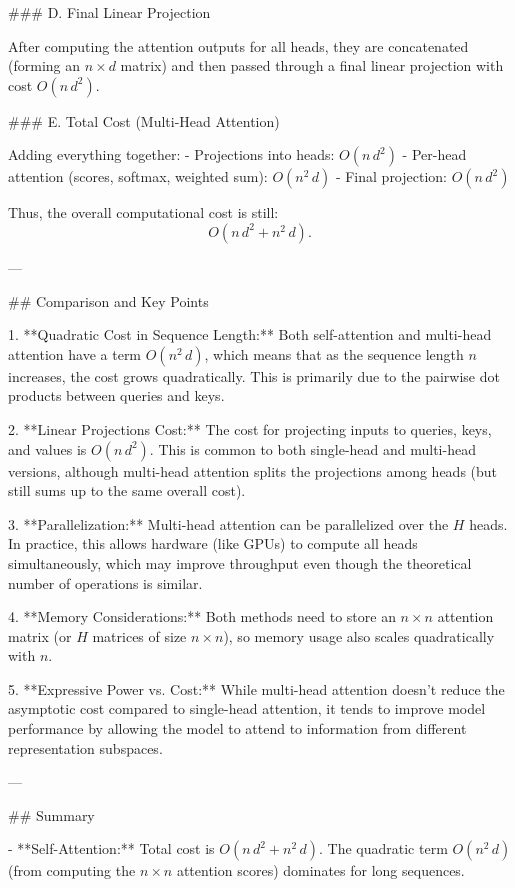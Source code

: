 ### D. Final Linear Projection

After computing the attention outputs for all heads, they are concatenated (forming an \( n \times d \) matrix) and then passed through a final linear projection with cost \( O(n\, d^2) \).

### E. Total Cost (Multi-Head Attention)

Adding everything together:
- Projections into heads: \( O(n\, d^2) \)
- Per-head attention (scores, softmax, weighted sum): \( O(n^2\, d) \)
- Final projection: \( O(n\, d^2) \)

Thus, the overall computational cost is still:
\[
O(n\, d^2 + n^2\, d).
\]

---

## Comparison and Key Points

1. **Quadratic Cost in Sequence Length:**  
   Both self-attention and multi-head attention have a term \( O(n^2\, d) \), which means that as the sequence length \( n \) increases, the cost grows quadratically. This is primarily due to the pairwise dot products between queries and keys.

2. **Linear Projections Cost:**  
   The cost for projecting inputs to queries, keys, and values is \( O(n\, d^2) \). This is common to both single-head and multi-head versions, although multi-head attention splits the projections among heads (but still sums up to the same overall cost).

3. **Parallelization:**  
   Multi-head attention can be parallelized over the \( H \) heads. In practice, this allows hardware (like GPUs) to compute all heads simultaneously, which may improve throughput even though the theoretical number of operations is similar.

4. **Memory Considerations:**  
   Both methods need to store an \( n \times n \) attention matrix (or \( H \) matrices of size \( n \times n \)), so memory usage also scales quadratically with \( n \).

5. **Expressive Power vs. Cost:**  
   While multi-head attention doesn’t reduce the asymptotic cost compared to single-head attention, it tends to improve model performance by allowing the model to attend to information from different representation subspaces.

---

## Summary

- **Self-Attention:**  
  Total cost is \( O(n\, d^2 + n^2\, d) \). The quadratic term \( O(n^2\, d) \) (from computing the \( n \times n \) attention scores) dominates for long sequences.

